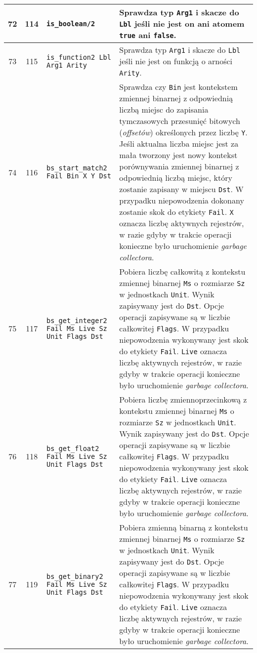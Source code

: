 \begin{longtable}{|c|c|p{5cm}|p{7cm}|}
\hline
72 & 114 & \texttt{is\_boolean/2} & Sprawdza typ \texttt{Arg1} i skacze do \texttt{Lbl} jeśli nie jest on ani atomem \texttt{true} ani \texttt{false}.\\
\hline
73 & 115 & \texttt{is\_function2 Lbl Arg1 Arity} & Sprawdza typ \texttt{Arg1} i skacze do \texttt{Lbl} jeśli nie jest on funkcją o arności \texttt{Arity}.\\
\hline
74 & 116 & \texttt{bs\_start\_match2 Fail Bin X Y Dst} & Sprawdza czy \texttt{Bin} jest kontekstem zmiennej binarnej z odpowiednią liczbą miejsc do zapisania tymczasowych przesunięć bitowych (\emph{offsetów}) określonych przez liczbę \texttt{Y}. Jeśli aktualna liczba miejsc jest za mała tworzony jest nowy kontekst porównywania zmiennej binarnej z odpowiednią liczbą miejsc, który zostanie zapisany w miejscu \texttt{Dst}. W przypadku niepowodzenia dokonany zostanie skok do etykiety \texttt{Fail}. \texttt{X} oznacza liczbę aktywnych rejestrów, w razie gdyby w trakcie operacji konieczne było uruchomienie \emph{garbage collectora}.\\
\hline
75 & 117 & \texttt{bs\_get\_integer2 Fail Ms Live Sz Unit Flags Dst} & Pobiera liczbę całkowitą z kontekstu zmiennej binarnej \texttt{Ms} o rozmiarze \texttt{Sz} w jednostkach \texttt{Unit}. Wynik zapisywany jest do \texttt{Dst}. Opcje operacji zapisywane są w liczbie całkowitej \texttt{Flags}.  W przypadku niepowodzenia wykonywany jest skok do etykiety \texttt{Fail}. \texttt{Live} oznacza liczbę aktywnych rejestrów, w razie gdyby w trakcie operacji konieczne było uruchomienie \emph{garbage collectora}. \\
\hline
76 & 118 & \texttt{bs\_get\_float2 Fail Ms Live Sz Unit Flags Dst} & Pobiera liczbę zmiennoprzecinkową z kontekstu zmiennej binarnej \texttt{Ms} o rozmiarze \texttt{Sz} w jednostkach \texttt{Unit}. Wynik zapisywany jest do \texttt{Dst}. Opcje operacji zapisywane są w liczbie całkowitej \texttt{Flags}.  W przypadku niepowodzenia wykonywany jest skok do etykiety \texttt{Fail}. \texttt{Live} oznacza liczbę aktywnych rejestrów, w razie gdyby w trakcie operacji konieczne było uruchomienie \emph{garbage collectora}. \\
\hline
77 & 119 & \texttt{bs\_get\_binary2 Fail Ms Live Sz Unit Flags Dst} & Pobiera zmienną binarną z kontekstu zmiennej binarnej \texttt{Ms} o rozmiarze \texttt{Sz} w jednostkach \texttt{Unit}. Wynik zapisywany jest do \texttt{Dst}. Opcje operacji zapisywane są w liczbie całkowitej \texttt{Flags}.  W przypadku niepowodzenia wykonywany jest skok do etykiety \texttt{Fail}. \texttt{Live} oznacza liczbę aktywnych rejestrów, w razie gdyby w trakcie operacji konieczne było uruchomienie \emph{garbage collectora}. \\

\end{longtable}
